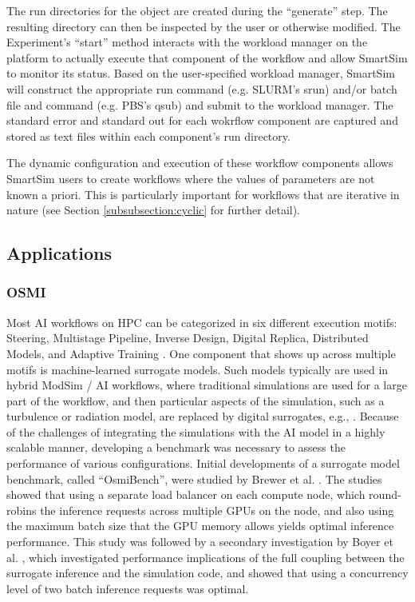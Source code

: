 \documentclass[utf8]{FrontiersinVancouver} %
\begin{document}
The run directories for the object are created during the ``generate'' step. The resulting directory can then be inspected by the user or otherwise modified. The Experiment's ``start'' method interacts with the workload manager on the platform to actually execute that component of the workflow and allow SmartSim to monitor its status. Based on the user-specified workload manager, SmartSim will construct the appropriate run command (e.g. SLURM's srun) and/or batch file and command (e.g. PBS's qsub) and submit to the workload manager. The standard error and standard out for each wokrflow component are captured and stored as text files within each component's run directory.

The dynamic configuration and execution of these workflow components allows SmartSim users to create workflows where the values of parameters are not known a priori. This is particularly important for workflows that are iterative in nature (see Section \ref{subsubsection:cyclic} for further detail).

\subsection{Applications}

\subsubsection{OSMI}

Most AI workflows on HPC can be categorized in six different execution motifs: Steering, Multistage Pipeline, Inverse Design, Digital Replica, Distributed Models, and Adaptive Training \cite{brewer2024ai}. One component that shows up across multiple motifs is machine-learned surrogate models. Such models typically are used in hybrid ModSim / AI workflows, where traditional simulations are used for a large part of the workflow, and then particular aspects of the simulation, such as a turbulence or radiation model, are replaced by digital surrogates, e.g., \cite{partee2022using, martinez2022roam, bhushan2023assessment}. Because of the challenges of integrating the simulations with the AI model in a highly scalable manner, developing a benchmark was necessary to assess the performance of various configurations. Initial developments of a surrogate model benchmark, called ``OsmiBench'', were studied by Brewer et al. \cite{brewer2021production}. The studies showed that using a separate load balancer on each compute node, which round-robins the inference requests across multiple GPUs on the node, and also using the maximum batch size that the GPU memory allows yields optimal inference performance. This study was followed by a secondary investigation by Boyer et al. \cite{boyer2022scalable}, which investigated performance implications of the full coupling between the surrogate inference and the simulation code, and showed that using a concurrency level of two batch inference requests was optimal. 
\end{document}
